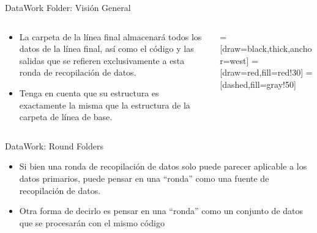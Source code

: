 \documentclass[11pt, aspectratio=169, compress]{beamer}
\begin{document}
\begin{frame}[t]{DataWork Folder: Visión General}
	\begin{columns}
		\begin{column}{0.5\textwidth}
		   \begin{itemize}
			   \item La carpeta de la línea final almacenará todos los datos de la línea final, así como el código y las salidas que se refieren exclusivamente a esta ronda de recopilación de datos. 
			   \item Tenga en cuenta que su estructura es exactamente la misma que la estructura de la carpeta de línea de base.
		   \end{itemize}
		\end{column}
		\begin{column}{0.5\textwidth} 
			=[draw=black,thick,anchor=west]
			=[draw=red,fill=red!30]
			=[dashed,fill=gray!50]
		\end{column}
	\end{columns}
\end{frame}
\begin{frame}{DataWork: Round Folders}
	\begin{itemize}
		\item Si bien una ronda de recopilación de datos solo puede parecer aplicable a los datos primarios, puede pensar en una ``ronda'' como una fuente de recopilación de datos.
		\item Otra forma de decirlo es pensar en una ``ronda'' como un conjunto de datos que se procesarán con el mismo código
	\end{itemize}
\end{frame}
\end{document}
